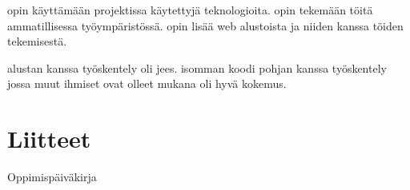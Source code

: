 \documentclass[11pt,a4paper,titlepage,oneside]{article}
\begin{document}
opin käyttämään projektissa käytettyjä teknologioita.
opin tekemään töitä ammatillisessa työympäristössä.
opin lisää web alustoista ja niiden kanssa töiden tekemisestä.
\medskip


alustan kanssa työskentely oli jees.
isomman koodi pohjan kanssa työskentely jossa muut ihmiset ovat olleet mukana oli hyvä kokemus.
\medskip

\fi








\newpage











\section*{Liitteet}               %

Oppimispäiväkirja




\end{document}
